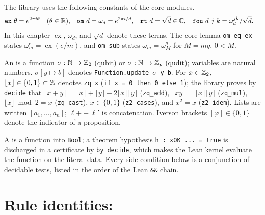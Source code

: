 The library uses the following constants of the core modules.
\begin{align*}
  \textnormal{\texttt{ex}}\ \theta &= e^{2\pi i\theta} \quad(\theta\in\mathbb{R}), &
  \textnormal{\texttt{om}}\ d &= \omega_d = e^{2\pi i/d}, &
  \textnormal{\texttt{rt}}\ d &= \sqrt{d}\in\mathbb{C}, &
  \textnormal{\texttt{fou}}\ d\ j\ k &= \omega_d^{jk}/\sqrt{d}.
\end{align*}
In this chapter $\operatorname{ex}$, $\omega_d$, and $\sqrt{d}$ denote these terms. The core
lemma \textnormal{\texttt{om\_\allowbreak{}eq\_\allowbreak{}ex}} states $\omega_m^e = \operatorname{ex}(e/m)$, and \textnormal{\texttt{om\_\allowbreak{}sub}} states
$\omega_m = \omega_M^{q}$ for $M = mq$, $0<M$.

An  is a function $\sigma:\mathbb{N}\to\mathbb{Z}_{2}$ (qubit) or $\sigma:\mathbb{N}\to\mathbb{Z}_{p}$ (qudit);
variables are natural numbers. $\sigma[y\mapsto b]$ denotes \textnormal{\texttt{Function.\allowbreak{}update \ensuremath{\sigma} y b}}. For
$x\in\mathbb{Z}_{2}$, $\lfloor x\rfloor\in\{0,1\}\subset\mathbb{Z}$ denotes \textnormal{\texttt{zq x}}
(\textnormal{\texttt{if x = 0 then 0 else 1}}); the library proves by \textnormal{\texttt{decide}} that
$\lfloor x+y\rfloor = \lfloor x\rfloor+\lfloor y\rfloor-2\lfloor x\rfloor\lfloor y\rfloor$
(\textnormal{\texttt{zq\_\allowbreak{}add}}), $\lfloor xy\rfloor=\lfloor x\rfloor\lfloor y\rfloor$ (\textnormal{\texttt{zq\_\allowbreak{}mul}}),
$\lfloor x\rfloor \bmod 2 = x$ (\textnormal{\texttt{zq\_\allowbreak{}cast}}), $x\in\{0,1\}$ (\textnormal{\texttt{z2\_\allowbreak{}cases}}), and $x^2=x$
(\textnormal{\texttt{z2\_\allowbreak{}idem}}). Lists are written $[a_1,\dots,a_n]$; $\ell\mathbin{+\!\!+}\ell'$ is
concatenation. Iverson brackets $[\varphi]\in\{0,1\}$ denote the indicator of a proposition.

A  is a function into \textnormal{\texttt{Bool}}; a theorem hypothesis \textnormal{\texttt{h : xOK .\allowbreak{}.\allowbreak{}.\allowbreak{} = true}}
is discharged in a certificate by \textnormal{\texttt{by decide}}, which makes the Lean kernel evaluate the
function on the literal data. Every side condition below is a conjunction of decidable tests,
listed in the order of the Lean \textnormal{\texttt{\&\&}} chain.

\section{Rule identities: \texorpdfstring{}{PathSum}}\label{sec:lean-pathsum-rules0}

